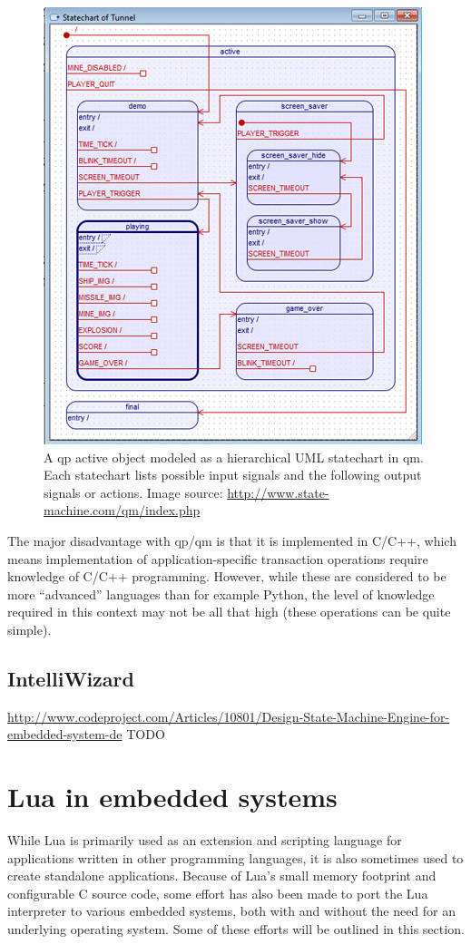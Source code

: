 \begin{figure}[h]
	\centering
	\includegraphics[scale=0.6]{img/qm_statechart.png}
	\caption[An UML statechart in QM]{A \gls{qp} active object modeled as a hierarchical UML statechart in \gls{qm}. Each statechart lists possible input signals and the following output signals or actions. Image source: \url{http://www.state-machine.com/qm/index.php} \label{figure:qm_statechart} }
\end{figure}

The major disadvantage with \gls{qp}/\gls{qm} is that it is implemented in C/C++, which means implementation of application-specific transaction operations require knowledge of C/C++ programming. However, while these are considered to be more “advanced” languages than for example Python, the level of knowledge required in this context may not be all that high (these operations can be quite simple).

\subsection{IntelliWizard}
\label{sec:intelliwizard}
\url{http://www.codeproject.com/Articles/10801/Design-State-Machine-Engine-for-embedded-system-de}
TODO

\section{Lua in embedded systems}
\label{sec:lua_in_embedded}
While Lua is primarily used as an extension and scripting language for applications written in other programming languages, it is also sometimes used to create standalone applications. Because of Lua’s small memory footprint and configurable C source code, some effort has also been made to port the Lua interpreter to various embedded systems, both with and without the need for an underlying operating system. Some of these efforts will be outlined in this section.

